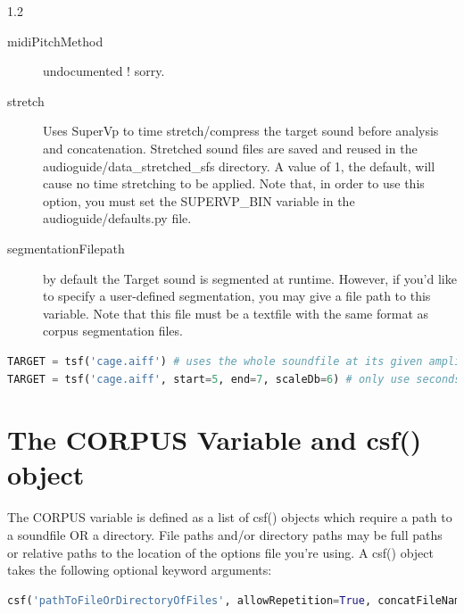 \documentclass{article}
\begin{document}
\begin{spacing}{1.2}
\begin{description}
\item[midiPitchMethod] undocumented !  sorry.
\item[stretch] Uses SuperVp to time stretch/compress the target sound before analysis and concatenation.  Stretched sound files are saved and reused in the audioguide/data\_stretched\_sfs directory.  A value of 1, the default, will cause no time stretching to be applied.  Note that, in order to use this option, you must set the SUPERVP\_BIN variable in the audioguide/defaults.py file.
\item[segmentationFilepath] by default the Target sound is segmented at runtime.  However, if you'd like to specify a user-defined segmentation, you may give a file path to this variable.  Note that this file must be a textfile with the same format as corpus segmentation files.
\end{description}


\begin{lstlisting}[language=python]
TARGET = tsf('cage.aiff') # uses the whole soundfile at its given amplitude
TARGET = tsf('cage.aiff', start=5, end=7, scaleDb=6) # only use seconds 5-7 of cage.aiff at double the amplitude.
\end{lstlisting}


\section{The CORPUS Variable and csf() object}
The CORPUS variable is defined as a list of csf() objects which require a path to a soundfile OR a directory.  File paths and/or directory paths may be full paths or relative paths to the location of the options file you're using.  A csf() object takes the following optional keyword arguments:


\begin{lstlisting}[language=python]
csf('pathToFileOrDirectoryOfFiles', allowRepetition=True, concatFileName=None,  end=None,  envelopeSlope=1,  excludeStr=None,  excludeTimes=[], hasParams=False, includeStr=None,  includeTimes=[],  limit={},  limitDur=None,  midiPitchMethod='composite',  offsetLen='30\%',  onsetLen=0.01,  recursive=True,  restrictInTime=0,  restrictOverlaps=None,  restrictRepetition=0.1,  scaleDb=0.0,  scaleDistance=1,  postSelectAmpBool=False, postSelectAmpMin=-12, postSelectAmpMax=+12, postSelectAmpMethod='power-mean-seg', segmentationExtension='.txt',  segmentationFile=None,  start=None,  superimposeRule=None,  transMethod=None,  transQuantize=0,  wholeFile=False, MWinstrName=None,  MWtext=None, MWnotehead='.')
\end{lstlisting}



\end{spacing}
\end{document}
